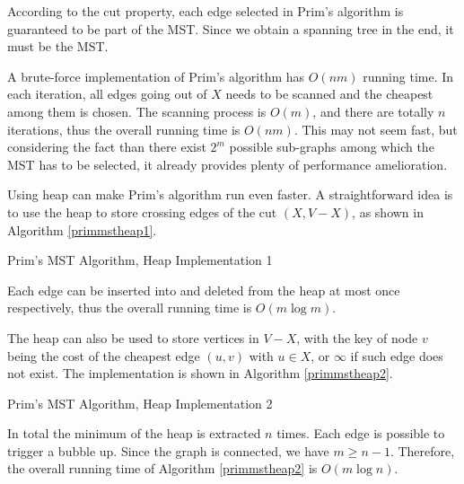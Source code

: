 According to the cut property, each edge selected in Prim's algorithm is guaranteed to be part of the MST. Since we obtain a spanning tree in the end, it must be the MST. 

A brute-force implementation of Prim's algorithm has $O(nm)$ running time. In each iteration, all edges going out of $X$ needs to be scanned and the cheapest among them is chosen. The scanning process is $O(m)$, and there are totally $n$ iterations, thus the overall running time is $O(nm)$. This may not seem fast, but considering the fact than there exist $2^m$ possible sub-graphs among which the MST has to be selected, it already provides plenty of performance amelioration.

Using heap can make Prim's algorithm run even faster. A straightforward idea is to use the heap to store crossing edges of the cut $(X,V-X)$, as shown in Algorithm \ref{primmstheap1}.
\begin{algorithm}[ht]
\caption{Prim's MST Algorithm, Heap Implementation 1}\label{primmstheap1}
\begin{algorithmic}[1]
\EndIf
\EndFor
\EndWhile
\end{algorithmic}
\end{algorithm}
Each edge can be inserted into and deleted from the heap at most once respectively, thus the overall running time is $O(m\log m)$. 

 The heap can also be used to store vertices in $V-X$, with the key of node $v$ being the cost of the cheapest edge $(u,v)$ with $u\in X$, or $\infty$ if such edge does not exist. The implementation is shown in Algorithm \ref{primmstheap2}.
\begin{algorithm}[ht]
\caption{Prim's MST Algorithm, Heap Implementation 2}\label{primmstheap2}
\begin{algorithmic}[1]
\EndIf
\EndFor
\EndWhile
\end{algorithmic}
\end{algorithm}

In total the minimum of the heap is extracted $n$ times. Each edge is possible to trigger a bubble up. Since the graph is connected, we have $m\geq n-1$. Therefore, the overall running time of Algorithm \ref{primmstheap2} is $O(m\log n)$.
\ifx\PREAMBLE\undefined

\fi